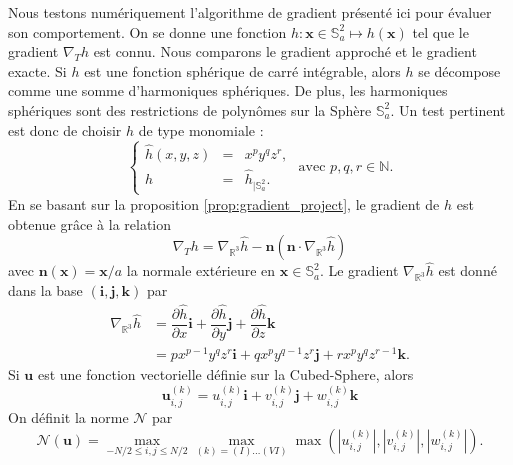 Nous testons numériquement l'algorithme de gradient présenté ici pour évaluer son comportement. On se donne une fonction $h : \mathbf{x} \in \mathbb{S}_a^2 \mapsto h(\mathbf{x})$ tel que le gradient $\nabla_T h$ est connu. Nous comparons le gradient approché et le gradient exacte.
Si $h$ est une fonction sphérique de carré intégrable, alors $h$ se décompose comme une somme d'harmoniques sphériques. De plus, les harmoniques sphériques sont des restrictions de polynômes sur la Sphère $\mathbb{S}_a^2$. Un test pertinent est donc de choisir $h$ de type monomiale :
\begin{equation}
\left\lbrace
\begin{array}{rcl}
\hat{h}(x,y,z) & = & x^p y^q z^r, \\
h & = & \hat{h}_{| \mathbb{S}_a^2}.
\end{array}
\right. \text{ avec } p,q,r \in \mathbb{N}.
\label{eq:grad_test}
\end{equation}
En se basant sur la proposition \ref{prop:gradient_project}, le gradient de $h$ est obtenue grâce à la relation
\begin{equation}
\nabla_T h = \nabla_{\mathbb{R}^3} \hat{h} - \mathbf{n} \left( \mathbf{n} \cdot \nabla_{\mathbb{R}^3} \hat{h} \right)
\end{equation}
avec $\mathbf{n}(\mathbf{x}) = \mathbf{x}/a$ la normale extérieure en $\mathbf{x} \in \mathbb{S}_a^2$. Le gradient $\nabla_{\mathbb{R}^3} \hat{h}$ est donné dans la base $(\mathbf{i}, \mathbf{j}, \mathbf{k})$ par 
\begin{align*}
\nabla_{\mathbb{R}^3} \hat{h} & = \dfrac{\partial \hat{h}}{\partial x} \mathbf{i} + \dfrac{\partial \hat{h}}{\partial y} \mathbf{j} + \dfrac{\partial \hat{h}}{\partial z} \mathbf{k}\\
                              & = p x^{p-1} y^q z^r \mathbf{i} + q x^p y^{q-1} z^r \mathbf{j} + r x^p y^q z^{r-1} \mathbf{k}.
\end{align*}
Si $\mathbf{u}$ est une fonction vectorielle définie sur la Cubed-Sphere, alors
\begin{equation}
\mathbf{u}_{i,j}^{(k)} = u_{i,j}^{(k)} \mathbf{i} + v_{i,j}^{(k)} \mathbf{j} + w_{i,j}^{(k)} \mathbf{k}
\end{equation}
On définit la norme $\mathcal{N}$ par
\begin{equation}
\label{eq:normN}
\mathcal{N}(\mathbf{u}) = \max_{-N/2 \leq i,j \leq N/2} \max_{(k) = (I) \ldots (VI)} \max (|u_{i,j}^{(k)}|, |v_{i,j}^{(k)}|, |w_{i,j}^{(k)}|).
\end{equation}
